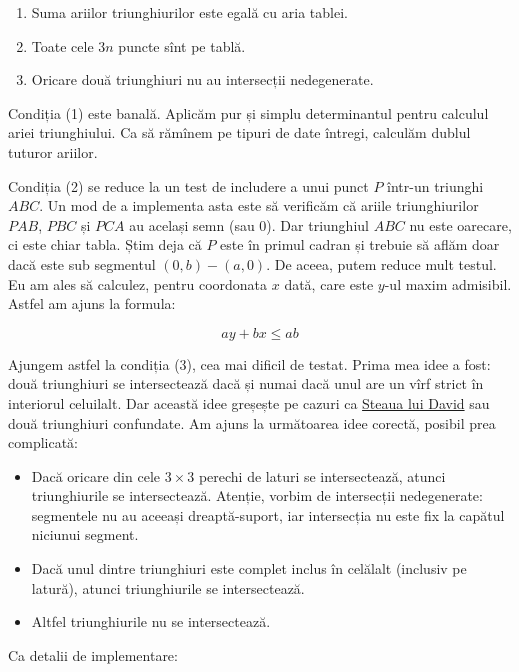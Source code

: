 \documentclass[../main.tex]{subfiles}
\begin{document}
\begin{enumerate}
  \item Suma ariilor triunghiurilor este egală cu aria tablei.
  \item Toate cele $3n$ puncte sînt pe tablă.
  \item Oricare două triunghiuri nu au intersecții nedegenerate.
\end{enumerate}

Condiția (1) este banală. Aplicăm pur și simplu determinantul pentru calculul ariei triunghiului. Ca să rămînem pe tipuri de date întregi, calculăm dublul tuturor ariilor.

Condiția (2) se reduce la un test de includere a unui punct $P$ într-un triunghi $ABC$. Un mod de a implementa asta este să verificăm că ariile triunghiurilor $PAB$, $PBC$ și $PCA$ au același semn (sau 0). Dar triunghiul $ABC$ nu este oarecare, ci este chiar tabla. Știm deja că $P$ este în primul cadran și trebuie să aflăm doar dacă este sub segmentul $(0,b)-(a,0)$. De aceea, putem reduce mult testul. Eu am ales să calculez, pentru coordonata $x$ dată, care este $y$-ul maxim admisibil. Astfel am ajuns la formula:

$$ay + bx \leq ab$$

Ajungem astfel la condiția (3), cea mai dificil de testat. Prima mea idee a fost: două triunghiuri se intersectează dacă și numai dacă unul are un vîrf strict în interiorul celuilalt. Dar această idee greșește pe cazuri ca \href{https://en.wikipedia.org/wiki/Star_of_David}{Steaua lui David} sau două triunghiuri confundate. Am ajuns la următoarea idee corectă, posibil prea complicată:

\begin{itemize}
  \item Dacă oricare din cele $3 \times 3$ perechi de laturi se intersectează, atunci triunghiurile se intersectează. Atenție, vorbim de intersecții nedegenerate: segmentele nu au aceeași dreaptă-suport, iar intersecția nu este fix la capătul niciunui segment.

  \item Dacă unul dintre triunghiuri este complet inclus în celălalt (inclusiv pe latură), atunci triunghiurile se intersectează.

  \item Altfel triunghiurile nu se intersectează.
\end{itemize}

Ca detalii de implementare:
\end{document}
